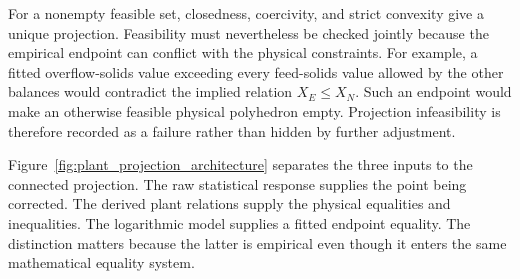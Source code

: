 For a nonempty feasible set, closedness, coercivity, and strict convexity give a unique projection. Feasibility must nevertheless be checked jointly because the empirical endpoint can conflict with the physical constraints. For example, a fitted overflow-solids value exceeding every feed-solids value allowed by the other balances would contradict the implied relation $X_E\le X_N$. Such an endpoint would make an otherwise feasible physical polyhedron empty. Projection infeasibility is therefore recorded as a failure rather than hidden by further adjustment.

Figure~\ref{fig:plant_projection_architecture} separates the three inputs to the connected projection. The raw statistical response supplies the point being corrected. The derived plant relations supply the physical equalities and inequalities. The logarithmic model supplies a fitted endpoint equality. The distinction matters because the latter is empirical even though it enters the same mathematical equality system.

